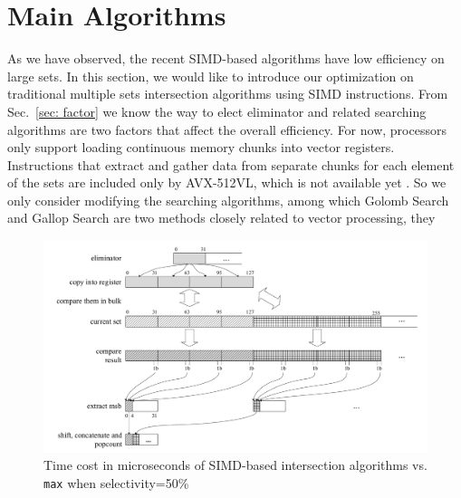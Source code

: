 \documentclass[runningheads,a4paper]{llncs}
\begin{document}
\section{Main Algorithms}
As we have observed, the recent SIMD-based algorithms have low efficiency on large sets.
In this section, we would like to introduce our optimization on traditional multiple sets intersection algorithms using SIMD instructions.
From Sec.~\ref{sec: factor} we know the way to elect eliminator and related searching algorithms are two factors that affect the overall efficiency.
For now, processors only support loading continuous memory chunks into vector registers.
Instructions that extract and gather data from separate chunks for each element of the sets are included only by AVX-512VL, which is not available yet \cite{Schlegel2011Fast}.
So we only consider modifying the searching algorithms, among which Golomb Search and Gallop Search are two methods closely related to vector processing, they 
\begin{figure}
	\centering
	\includegraphics[width=1.0\linewidth]{simd_me}
	\caption{Time cost in microseconds of SIMD-based intersection algorithms vs. \texttt{max} when selectivity=50\%}
	\label{fig: simd_me}
\end{figure}
\end{document}
